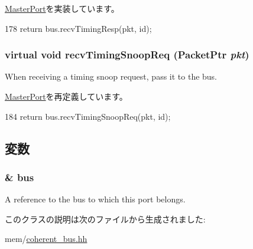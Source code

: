 \hyperlink{classMasterPort_abd323548d6c93f8b0543f1fe3a86ca35}{MasterPort}を実装しています。


\begin{DoxyCode}
178         { return bus.recvTimingResp(pkt, id); }
\end{DoxyCode}
\hypertarget{classCoherentBus_1_1CoherentBusMasterPort_ae43c73eff109f907118829fcfa9e7096}{
\subsubsection[{recvTimingSnoopReq}]{\setlength{\rightskip}{0pt plus 5cm}virtual void recvTimingSnoopReq ({\bf PacketPtr} {\em pkt})}}
\label{classCoherentBus_1_1CoherentBusMasterPort_ae43c73eff109f907118829fcfa9e7096}
When receiving a timing snoop request, pass it to the bus. 

\hyperlink{classMasterPort_ae43c73eff109f907118829fcfa9e7096}{MasterPort}を再定義しています。


\begin{DoxyCode}
184         { return bus.recvTimingSnoopReq(pkt, id); }
\end{DoxyCode}


\subsection{変数}
\hypertarget{classCoherentBus_1_1CoherentBusMasterPort_a3fedef8f1565149424b7e0e4772fe8c9}{
\subsubsection[{bus}]{\& {\bf bus}}}
\label{classCoherentBus_1_1CoherentBusMasterPort_a3fedef8f1565149424b7e0e4772fe8c9}
A reference to the bus to which this port belongs. 

このクラスの説明は次のファイルから生成されました:\begin{DoxyCompactItemize}
\item 
mem/\hyperlink{coherent__bus_8hh}{coherent\_\-bus.hh}\end{DoxyCompactItemize}
